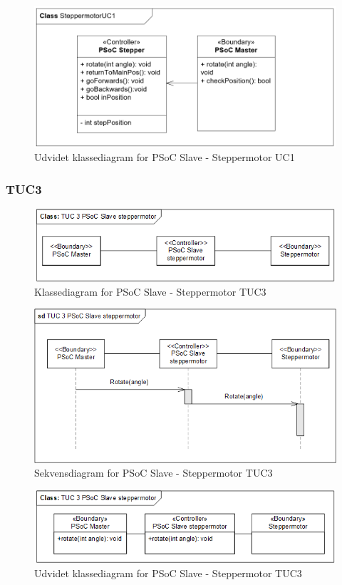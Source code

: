 \begin{figure}[H]
	\centering
	\includegraphics[width=1\textwidth]{Images/Applikationsmodeller/PSoCStepper/ClassextSteppermotorUC1.png}
	\caption{Udvidet klassediagram for PSoC Slave - Steppermotor UC1}
	\label{fig:postClassStepperUC1}
\end{figure}

\subsubsection{TUC3}
\begin{figure}[H]
	\centering
	\includegraphics[width=1\textwidth]{Images/Applikationsmodeller/PSoCStepper/first_class_TUC_3_PSoC_Slave_steppermotor.png}
	\caption{Klassediagram for PSoC Slave - Steppermotor TUC3}
	\label{fig:preClassStepperTUC3}
\end{figure}

\begin{figure}[H]
	\centering
	\includegraphics[width=1\textwidth]{Images/Applikationsmodeller/PSoCStepper/sd_TUC_3_PSoC_Slave_steppermotor.png}
	\caption{Sekvensdiagram for PSoC Slave - Steppermotor TUC3}
	\label{fig:sdStepperTUC3}
\end{figure}

\begin{figure}[H]
	\centering
	\includegraphics[width=1\textwidth]{Images/Applikationsmodeller/PSoCStepper/second_class_TUC_3_PSoC_Slave_steppermotor.png}
	\caption{Udvidet klassediagram for PSoC Slave - Steppermotor TUC3}
	\label{fig:postClassStepperTUC3}
\end{figure}
